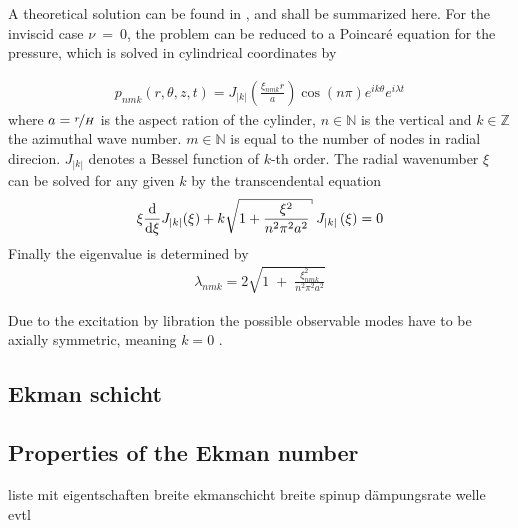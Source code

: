 A theoretical solution can be found in \citep{Greenspan1990}, and shall be summarized here.
For the inviscid case $\nu~=~0$, the problem can be reduced to a Poincar\'{e} equation for the pressure,
which is solved in cylindrical coordinates by

\begin{align}
    p_{nmk}(r, \theta, z, t) = J_{|k|}\left(\frac{\xi_{nmk}r}{a} \right)\cos(n\pi)e^{ik\theta}e^{i\lambda t}
\end{align}
where $a=\nicefrac{r}{H}$ is the aspect ration of the cylinder,
$n\in\mathbb{N}$ is the vertical and $k\in\mathbb{Z}$ the azimuthal wave number.
$m\in\mathbb{N}$ is equal to the number of nodes in radial direcion.
$J_{|k|}$ denotes a Bessel function of $k$-th order.
The radial wavenumber $\xi$  can be solved for any given $k$ by the transcendental equation
\begin{align}
    \xi \frac{\dif}{\dif \xi}J_{|k|}(\xi) + k \sqrt{1 + \frac{\xi^2}{n^2\pi^2a^2}} \; J_{|k|}\left(\xi\right) = 0
\end{align}
Finally the eigenvalue is determined by
\begin{align}
    \lambda_{nmk} = 2\sqrt{1 \; + \;\frac{ \xi_{nmk}^2}{n^2\pi^2a^2}}
\end{align}

Due to the excitation by libration the possible observable modes have to be axially symmetric, meaning $k=0$ \citep{}.
\subsection{Ekman schicht}

\subsection{Properties of the Ekman number}
liste mit eigentschaften
breite ekmanschicht breite
spinup
dämpungsrate welle evtl




